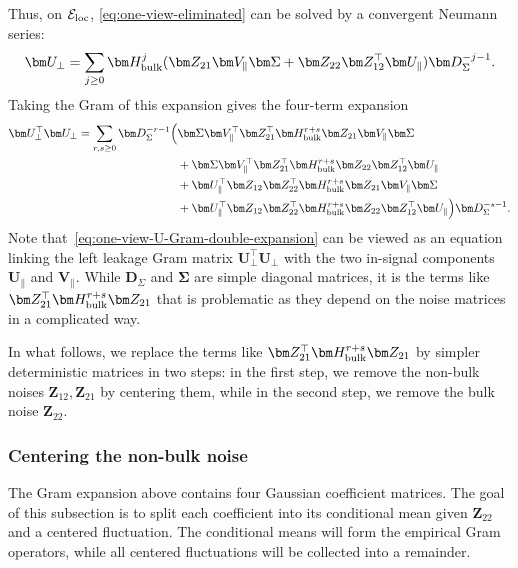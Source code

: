 \documentclass[11pt]{article}
\newcommand{\trans}{\top}
\newcommand{\cE}{\mathcal{E}}
\begin{document}
Thus, on $\cE_{\rm loc}$, \cref{eq:one-view-eliminated} can be solved by a
convergent Neumann series: 
\begin{equation}
\label{eq:one-view-U-finite-expansion}
  \bm U_\perp
  =
  \sum_{j \geq 0}
    \bm H_{\rm bulk}^j (\bm Z_{21}\bm V_\parallel\bm\Sigma
  +
  \bm Z_{22}\bm Z_{12}^\trans\bm U_\parallel) \bm D_\Sigma^{-j-1}.
\end{equation}
Taking the Gram of this expansion gives the four-term expansion
\begin{align}
\label{eq:one-view-U-Gram-double-expansion}
  \bm U_\perp^\trans\bm U_\perp
  =
  \sum_{r,s\geq 0}
  \bm D_\Sigma^{-r-1}
  \Bigl(&
    \bm\Sigma\bm V_\parallel^\trans
    \bm Z_{21}^\trans\bm H_{\rm bulk}^{r+s}\bm Z_{21}
    \bm V_\parallel\bm\Sigma
    \notag\\
  &+
    \bm\Sigma\bm V_\parallel^\trans
    \bm Z_{21}^\trans\bm H_{\rm bulk}^{r+s}\bm Z_{22}
    \bm Z_{12}^\trans\bm U_\parallel
    \notag\\
  &+
    \bm U_\parallel^\trans\bm Z_{12}\bm Z_{22}^\trans
    \bm H_{\rm bulk}^{r+s}\bm Z_{21}
    \bm V_\parallel\bm\Sigma
    \notag\\
  &+
    \bm U_\parallel^\trans\bm Z_{12}\bm Z_{22}^\trans
    \bm H_{\rm bulk}^{r+s}\bm Z_{22}\bm Z_{12}^\trans
    \bm U_\parallel
  \Bigr)
  \bm D_\Sigma^{-s-1}.
\end{align}
Note that~\cref{eq:one-view-U-Gram-double-expansion} can be viewed as an equation linking the left leakage Gram matrix $\bm U_\perp^\trans\bm U_\perp$ with the two in-signal components $\bm U_\parallel$ and $\bm V_\parallel$. 
While $\bm D_\Sigma$ and $\bm \Sigma$ are simple diagonal matrices, it is the terms like  $\bm Z_{21}^\trans\bm H_{\rm bulk}^{r+s}\bm Z_{21}$ that is problematic as they depend on the noise matrices in a complicated way. 

In what follows, we replace the terms like $\bm Z_{21}^\trans\bm H_{\rm bulk}^{r+s}\bm Z_{21}$ by simpler deterministic matrices in two steps: 
in the first step, we remove the non-bulk noises $\bm Z_{12}, \bm Z_{21}$ by centering them, while in the second step, we remove the bulk noise $\bm Z_{22}$.


\subsubsection{Centering the non-bulk noise}
The Gram expansion above contains four Gaussian coefficient matrices.
The goal of this subsection is to split each coefficient into its
conditional mean given $\bm Z_{22}$ and a centered fluctuation.  The conditional
means will form the empirical Gram operators, while all centered
fluctuations will be collected into a remainder.
\end{document}

